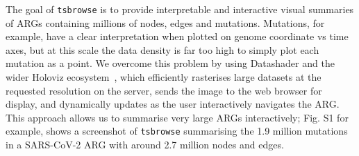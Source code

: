 \documentclass[unnumsec,webpdf,contemporary,large,namedate]{oup-authoring-template}%
\begin{document}
The goal of \texttt{tsbrowse} is to provide interpretable
and interactive visual summaries of ARGs containing millions of nodes, edges
and mutations. Mutations, for example, have a clear interpretation
when plotted on genome coordinate vs time axes, but at this scale
the data density is far too high to simply plot each mutation as a point.
We overcome this problem by using Datashader and the wider
Holoviz ecosystem~\citep{Holoviz}, which efficiently rasterises large datasets
at the requested resolution on the server, sends the image to the web browser
for display, and dynamically updates as the user interactively navigates the
ARG.
This approach allows us to summarise very large ARGs interactively;
Fig. S1 for example, shows a screenshot of
\texttt{tsbrowse} summarising the 1.9 million mutations in a SARS-CoV-2
ARG with around 2.7 million nodes and edges.


\end{document}
